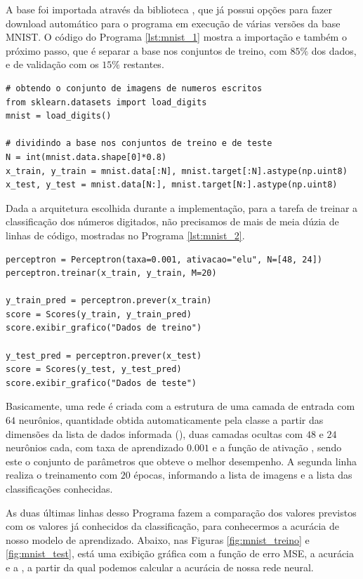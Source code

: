 A base foi importada através da biblioteca , que já possui opções para fazer download automático para o programa em execução de várias versões da base MNIST. O código do Programa \ref{lst:mnist_1} mostra a importação e também o próximo passo, que é separar a base nos conjuntos de treino, com $85\%$ dos dados, e de validação com os $15\%$ restantes.
\newline
\estiloR
\begin{lstlisting}[caption={Trecho do script \eng{mnist\_test.py}}, label={lst:mnist_1}, escapeinside={\%}]
# obtendo o conjunto de imagens de numeros escritos
from sklearn.datasets import load_digits
mnist = load_digits()

# dividindo a base nos conjuntos de treino e de teste
N = int(mnist.data.shape[0]*0.8)
x_train, y_train = mnist.data[:N], mnist.target[:N].astype(np.uint8)
x_test, y_test = mnist.data[N:], mnist.target[N:].astype(np.uint8)
\end{lstlisting}


Dada a arquitetura escolhida durante a implementação, para a tarefa de treinar a classificação dos números digitados, não precisamos de mais de meia dúzia de linhas de código, mostradas no Programa \ref{lst:mnist_2}.
\newline
\estiloR
\begin{lstlisting}[caption={Trecho do script \eng{mnist\_test.py}}, label={lst:mnist_2}, escapeinside={\%}]
perceptron = Perceptron(taxa=0.001, ativacao="elu", N=[48, 24])
perceptron.treinar(x_train, y_train, M=20)

y_train_pred = perceptron.prever(x_train)
score = Scores(y_train, y_train_pred)
score.exibir_grafico("Dados de treino")

y_test_pred = perceptron.prever(x_test)
score = Scores(y_test, y_test_pred)
score.exibir_grafico("Dados de teste")
\end{lstlisting}


Basicamente, uma rede é criada com a estrutura de uma camada de entrada com $64$ neurônios, quantidade obtida automaticamente pela classe a partir das dimensões da lista de dados informada (), duas camadas ocultas com $48$ e $24$ neurônios cada, com taxa de aprendizado $0.001$ e a função de ativação , sendo este o conjunto de parâmetros que obteve o melhor desempenho. A segunda linha realiza o treinamento com $20$ épocas, informando a lista de imagens e a lista das classificações conhecidas.

As duas últimas linhas desso Programa fazem a comparação dos valores previstos com os valores já conhecidos da classificação, para conhecermos a acurácia de nosso modelo de aprendizado. Abaixo, nas Figuras \ref{fig:mnist_treino} e \ref{fig:mnist_test}, está uma exibição gráfica com a função de erro MSE, a acurácia e a , a partir da qual podemos calcular a acurácia de nossa rede neural.

